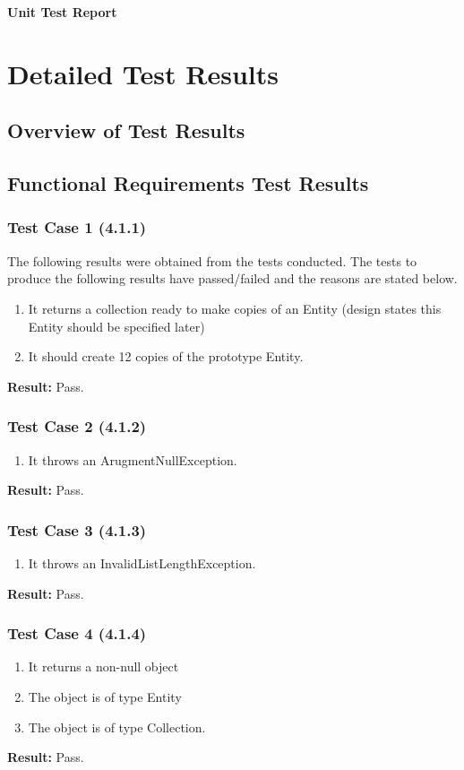 \documentclass[a4paper,12pt]{article}
\begin{document}
\newpage

\begin{center}
	\huge \bfseries Unit Test Report \\[2cm]
\end{center}

\section{Detailed Test Results}
	\subsection{Overview of Test Results}
	\subsection{Functional Requirements Test Results}
		\subsubsection{Test Case 1 (4.1.1)}
			The following results were obtained from the tests conducted. The tests to produce the following results have passed/failed and the reasons are stated below.
				\begin{enumerate}
					\item It returns a collection ready to make copies of an Entity (design states this Entity should be speciﬁed later)
					\item It should create 12 copies of the prototype Entity.
				\end{enumerate}
			\textbf{Result: }Pass.
		\subsubsection{Test Case 2 (4.1.2)}
				\begin{enumerate}
					\item It throws an ArugmentNullException.
				\end{enumerate}
			\textbf{Result: }Pass.
		\subsubsection{Test Case 3 (4.1.3)}
				\begin{enumerate}
					\item It throws an InvalidListLengthException.
				\end{enumerate}
			\textbf{Result: }Pass.
		\subsubsection{Test Case 4 (4.1.4)}
				\begin{enumerate}
					\item It returns a non-null object
					\item The object is of type Entity
					\item The object is of type Collection.
				\end{enumerate}
			\textbf{Result: }Pass.
\end{document}
